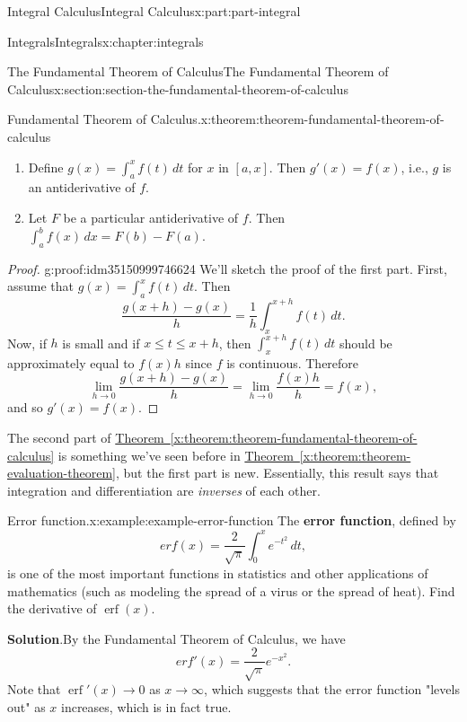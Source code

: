 \documentclass[twoside,10pt,]{tufte-book}
\newcommand{\blocktitlefont}{\relax}
\newcommand{\xreffont}{\relax}
\newcommand{\terminology}[1]{\textbf{#1}}
\numberwithin{equation}{part}
\newcommand{\erf}[1]{\operatorname{erf} #1}
\begin{document}
\begin{partptx}{Integral Calculus}{}{Integral Calculus}{}{}{x:part:part-integral}
\begin{chapterptx}{Integrals}{}{Integrals}{}{}{x:chapter:integrals}
\begin{sectionptx}{The Fundamental Theorem of Calculus}{}{The Fundamental Theorem of Calculus}{}{}{x:section:section-the-fundamental-theorem-of-calculus}
\begin{theorem}{Fundamental Theorem of Calculus.}{}{x:theorem:theorem-fundamental-theorem-of-calculus}
\begin{enumerate}
\item{}Define \(g(x) = \int_{a}^{x}f(t)\,dt\) for \(x\) in \([a,x]\). Then \(g'(x) = f(x)\), i.e., \(g\) is an antiderivative of \(f\).%
\item{}Let \(F\) be a particular antiderivative of \(f\). Then \(\int_{a}^{b}f(x)\,dx = F(b) - F(a).\)%
\end{enumerate}
\end{theorem}
\begin{proof}{}{g:proof:idm35150999746624}
We'll sketch the proof of the first part. First, assume that \(g(x) = \int_{a}^{x}f(t)\,dt\). Then%
\begin{equation*}
\frac{g(x+h)-g(x)}{h} = \frac{1}{h}\int_{x}^{x+h}f(t)\,dt.
\end{equation*}
Now, if \(h\) is small and if \(x\leq t\leq x+h\), then \(\int_{x}^{x+h}f(t)\,dt\) should be approximately equal to \(f(x)h\) since \(f\) is continuous. Therefore%
\begin{equation*}
\lim_{h\to0}\frac{g(x+h)-g(x)}{h} = \lim_{h\to0}\frac{f(x)h}{h} = f(x),
\end{equation*}
and so \(g'(x) = f(x)\).%
\end{proof}
The second part of \hyperref[x:theorem:theorem-fundamental-theorem-of-calculus]{Theorem~{\xreffont\ref{x:theorem:theorem-fundamental-theorem-of-calculus}}} is something we've seen before in \hyperref[x:theorem:theorem-evaluation-theorem]{Theorem~{\xreffont\ref{x:theorem:theorem-evaluation-theorem}}}, but the first part is new. Essentially, this result says that integration and differentiation are \emph{inverses} of each other.%
\begin{example}{Error function.}{x:example:example-error-function}%
The \terminology{error function}, defined by%
\begin{equation*}
erf(x) = \frac{2}{\sqrt{\pi}}\int_{0}^{x}e^{-t^{2}}\,dt,
\end{equation*}
is one of the most important functions in statistics and other applications of mathematics (such as modeling the spread of a virus or the spread of heat). Find the derivative of \(\erf(x)\).%
\par\smallskip%
\noindent\textbf{\blocktitlefont Solution}.\hypertarget{g:solution:idm35150999738816}{}\quad{}By the Fundamental Theorem of Calculus, we have%
\begin{equation*}
erf'(x) = \frac{2}{\sqrt{\pi}}e^{-x^{2}}.
\end{equation*}
Note that \(\erf'(x)\to0\) as \(x\to\infty\), which suggests that the error function "levels out" as \(x\) increases, which is in fact true.%

\end{example}
\end{sectionptx}
\end{chapterptx}
\end{partptx}
\end{document}

